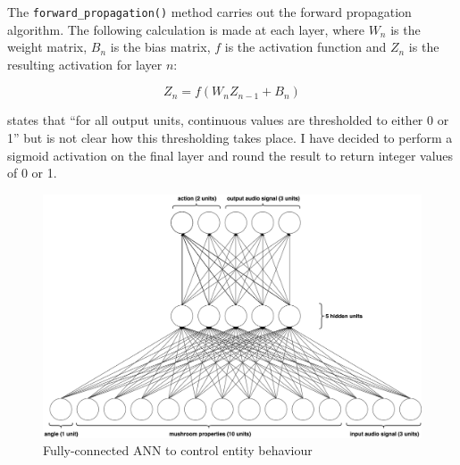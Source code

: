 \documentclass[12pt,a4paper]{report}
\begin{document}
The \texttt{forward\_propagation()} method carries out the forward propagation algorithm. The following calculation is made at each layer, where $W_n$ is the weight matrix, $B_n$ is the bias matrix, $f$ is the activation function and $Z_n$ is the resulting activation for layer $n$:

$$ Z_n = f(W_nZ_{n-1} + B_n) $$  

\citet{Cangelosi1998} states that ``for all output units, continuous values are thresholded to either 0 or 1'' but is not clear how this thresholding takes place. I have decided to perform a sigmoid activation on the final layer and round the result to return integer values of 0 or 1.

\begin{figure}[t]
  \centering
  \includegraphics[width=.9\linewidth]{figs/fullneural}
  \caption{Fully-connected ANN to control entity behaviour}
  \label{fig:fullneural}
\end{figure}



    
    
\end{document}
